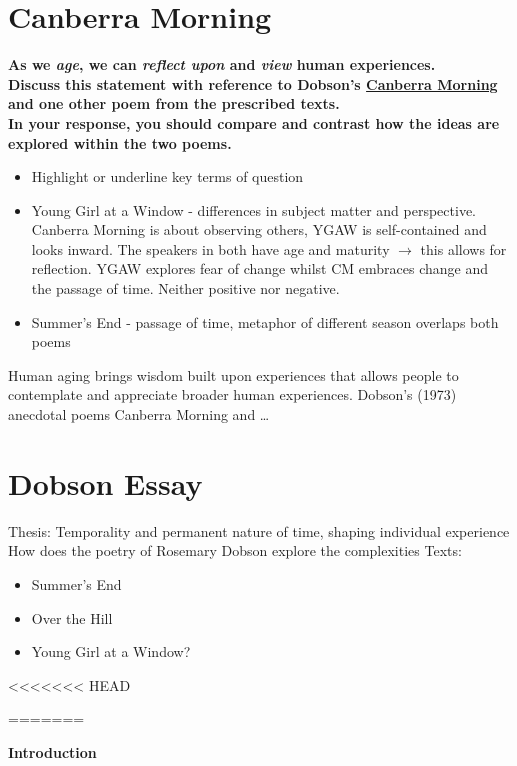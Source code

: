 \section{Canberra Morning} \label{28/11/2024}
	\textbf{As we \textit{age}, we can \textit{reflect upon} and \textit{view} human experiences. \\
	Discuss this statement with reference to Dobson's \underline{Canberra Morning} and one other poem from the prescribed texts. \\
	In your response, you should compare and contrast how the ideas are explored within the two poems.}

	\begin{itemize}
		\item Highlight or underline key terms of question
		\item Young Girl at a Window - differences in subject matter and perspective. Canberra Morning is about observing others, YGAW is self-contained and looks inward. The speakers in both have age and maturity $\rightarrow$ this allows for reflection. YGAW explores fear of change whilst CM embraces change and the passage of time. Neither positive nor negative.
	\item Summer's End - passage of time, metaphor of different season overlaps both poems
	\end{itemize}

	Human aging brings wisdom built upon experiences that allows people to contemplate and appreciate broader human experiences. Dobson's (1973) anecdotal poems Canberra Morning and \dots

\section{Dobson Essay} \label{13/12/2024}
	Thesis: Temporality and permanent nature of time, shaping individual experience
	How does the poetry of Rosemary Dobson explore the complexities
	Texts:
	\begin{itemize}
		\item Summer's End
		\item Over the Hill
		\item Young Girl at a Window?
	\end{itemize}
<<<<<<< HEAD
	
=======
	
	\textbf{Introduction}


